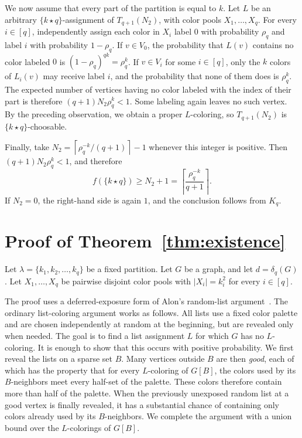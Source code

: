 \documentclass[12pt]{article}
\numberwithin{equation}{section}
\theoremstyle{definition}
\newcommand{\equalparts}[2]{\{#1\star #2\}}
\begin{document}
We now assume that every part of the partition is equal to $k$. Let $L$ be an
arbitrary $\equalparts{k}{q}$-assignment of $T_{q+1}(N_2)$, with color pools
$X_1,\ldots,X_q$. For every $i\in[q]$, independently assign each color in
$X_i$ label $0$ with probability $\rho_q$ and label $i$ with probability
$1-\rho_q$. If $v\in V_0$, the probability that $L(v)$ contains no color
labeled $0$ is $(1-\rho_q)^{qk}=\rho_q^k$.
If $v\in V_i$ for some $i\in[q]$, only the $k$ colors of $L_i(v)$  
may receive label $i$, and the probability that none of them does is
$\rho_q^k$.
The expected number of vertices having no color labeled with the index of
their part is therefore $(q+1)N_2\rho_q^k<1$.
Some labeling again leaves no such vertex. By the preceding observation,
we obtain a proper $L$-coloring, so $T_{q+1}(N_2)$ is
$\equalparts{k}{q}$-choosable.

Finally, take $N_2=\left\lceil \rho_q^{-k}/(q+1)\right\rceil-1$
whenever this integer is positive. Then $(q+1)N_2\rho_q^k<1$, and therefore
\[
 f(\equalparts{k}{q})\geq N_2+1
 =\left\lceil\frac{\rho_q^{-k}}{q+1}\right\rceil.
\]
If $N_2=0$, the right-hand side is again $1$, and the conclusion follows from
$K_q$.


\section{Proof of Theorem~\ref{thm:existence}}
\label{sec:surrounded}

Let $\lambda=\{k_1,k_2,\ldots,k_q\}$ be a fixed partition. Let $G$ be a
graph, and let $d=\delta_q(G)$.
Let $X_1,\ldots,X_q$ be pairwise disjoint color pools with $|X_i| = k_i^2$ for every $i \in [q]$.
 

The proof uses a deferred-exposure form of Alon's random-list
argument~\cite{Alon2000}. The ordinary list-coloring argument works as
follows. All lists use a fixed color palette and are chosen independently at
random at the beginning, but are revealed only when needed. The goal is to
find a list assignment $L$ for which $G$ has no $L$-coloring. It is enough
to show that this occurs with positive probability. We first reveal
the lists on a sparse set $B$. Many vertices outside $B$ are then
\emph{good}, each of which has the property that for every $L$-coloring of
$G[B]$, the colors used by its $B$-neighbors meet every half-set of the
palette. These colors therefore contain more than half of the palette. When
the previously unexposed random list at a good vertex is finally revealed,
it has a substantial chance of containing only colors already used by its
$B$-neighbors. We complete the argument with a union bound over the
$L$-colorings of $G[B]$.
\end{document}
